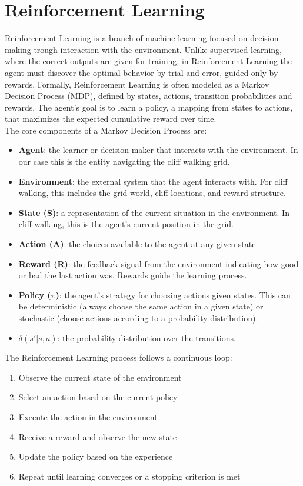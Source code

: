 \documentclass[a4paper,12pt]{article}
\begin{document}
\section{Reinforcement Learning}
Reinforcement Learning is a branch of machine learning focused on decision making trough interaction with the environment. Unlike supervised learning, where the correct outputs are given for training, in Reinforcement Learning the agent must discover the optimal behavior by trial and error, guided only by rewards. Formally, Reinforcement Learning is often modeled as a Markov Decision Process (MDP), defined by states, actions, transition probabilities and rewards. The agent's goal is to learn a policy, a mapping from states to actions, that maximizes the expected cumulative reward over time.
\vspace{0,5cm}\\
The core components of a Markov Decision Process are:
\begin{itemize}
    \item \textbf{Agent}: the learner or decision-maker that interacts with the environment. In our case this is the entity navigating the cliff walking grid.
    \item \textbf{Environment}: the external system that the agent interacts with. For cliff walking, this includes the grid world, cliff locations, and reward structure.
    \item \textbf{State (S)}: a representation of the current situation in the environment. In cliff walking, this is the agent's current position in the grid.
    \item \textbf{Action (A)}: the choices available to the agent at any given state.
    \item \textbf{Reward (R)}: the feedback signal from the environment indicating how good or bad the last action was. Rewards guide the learning process.
    \item \textbf{Policy ($\pi$)}: the agent's strategy for choosing actions given states. This can be deterministic (always choose the same action in a given state) or stochastic (choose actions according to a probability distribution).
    \item \textbf{$\delta(s'|s,a)$}: the probability distribution over the transitions.
\end{itemize}
The Reinforcement Learning process follows a continuous loop:
\begin{enumerate}
    \item Observe the current state of the environment
    \item Select an action based on the current policy
    \item Execute the action in the environment
    \item Receive a reward and observe the new state
    \item Update the policy based on the experience
    \item Repeat until learning converges or a stopping criterion is met
\end{enumerate}
\end{document}
